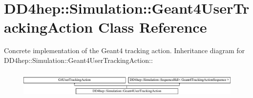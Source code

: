 \hypertarget{class_d_d4hep_1_1_simulation_1_1_geant4_user_tracking_action}{
\section{DD4hep::Simulation::Geant4UserTrackingAction Class Reference}
\label{class_d_d4hep_1_1_simulation_1_1_geant4_user_tracking_action}
}


Concrete implementation of the Geant4 tracking action.  
Inheritance diagram for DD4hep::Simulation::Geant4UserTrackingAction::\begin{figure}[H]
\begin{center}
\leavevmode
\includegraphics[height=1.3494cm]{class_d_d4hep_1_1_simulation_1_1_geant4_user_tracking_action}
\end{center}
\end{figure}
